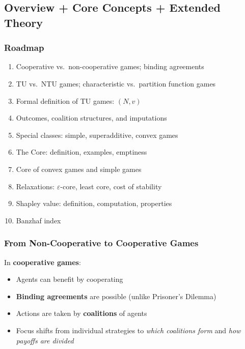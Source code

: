 \subsection{Overview + Core Concepts + Extended Theory}

\subsubsection*{Roadmap}
\begin{enumerate}
  \item Cooperative vs.\ non-cooperative games; binding agreements
  \item TU vs.\ NTU games; characteristic vs.\ partition function games
  \item Formal definition of TU games: $(N, v)$
  \item Outcomes, coalition structures, and imputations
  \item Special classes: simple, superadditive, convex games
  \item The Core: definition, examples, emptiness
  \item Core of convex games and simple games
  \item Relaxations: $\varepsilon$-core, least core, cost of stability
  \item Shapley value: definition, computation, properties
  \item Banzhaf index
\end{enumerate}

\bigseparator

\subsubsection{From Non-Cooperative to Cooperative Games}

\begin{defbox}
In \textbf{cooperative games}:
\begin{itemize}
  \item Agents can benefit by cooperating
  \item \textbf{Binding agreements} are possible (unlike Prisoner's Dilemma)
  \item Actions are taken by \textbf{coalitions} of agents
  \item Focus shifts from individual strategies to \textit{which coalitions form} and \textit{how payoffs are divided}
\end{itemize}
\end{defbox}

